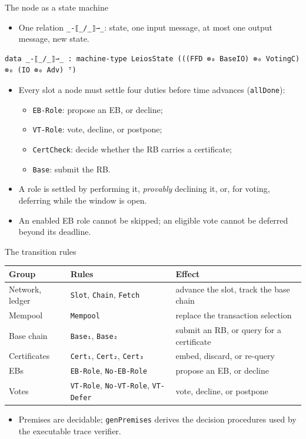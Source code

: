 \documentclass[aspectratio=169,10pt]{beamer}
\newcommand{\agda}[1]{\texttt{#1}}
\begin{document}
\begin{frame}[fragile]{The node as a state machine}
  \begin{itemize}
    \item One relation \agda{\_-⟦\_/\_⟧⇀\_}: state, one input message,
          at most one output message, new state.
  \end{itemize}
\begin{verbatim}
data _-⟦_/_⟧⇀_ : machine-type LeiosState (((FFD ⊗₀ BaseIO) ⊗₀ VotingC) ⊗₀ (IO ⊗₀ Adv) ᵀ)
\end{verbatim}
  \begin{itemize}
    \item Every slot a node must settle four duties before time advances
          (\agda{allDone}):
      \begin{itemize}
        \item \agda{EB-Role}: propose an EB, or decline;
        \item \agda{VT-Role}: vote, decline, or postpone;
        \item \agda{CertCheck}: decide whether the RB carries a certificate;
        \item \agda{Base}: submit the RB.
      \end{itemize}
    \item A role is settled by performing it, \emph{provably} declining it,
          or, for voting, deferring while the window is open.
    \item An enabled EB role cannot be skipped; an eligible vote cannot
          be deferred beyond its deadline.
  \end{itemize}
\end{frame}

\begin{frame}{The transition rules}
  \centering\small
  \begin{tabular}{@{}lll@{}}
    \toprule
    Group & Rules & Effect \\
    \midrule
    Network, ledger & \agda{Slot}, \agda{Chain}, \agda{Fetch}
      & advance the slot, track the base chain \\
    Mempool & \agda{Mempool} & replace the transaction selection \\
    Base chain & \agda{Base₁}, \agda{Base₂}
      & submit an RB, or query for a certificate \\
    Certificates & \agda{Cert₁}, \agda{Cert₂}, \agda{Cert₃}
      & embed, discard, or re-query \\
    EBs & \agda{EB-Role}, \agda{No-EB-Role} & propose an EB, or decline \\
    Votes & \agda{VT-Role}, \agda{No-VT-Role}, \agda{VT-Defer}
      & vote, decline, or postpone \\
    \bottomrule
  \end{tabular}

  \vspace{4mm}
  \begin{itemize}
    \item Premises are decidable; \agda{genPremises} derives the decision
          procedures used by the executable trace verifier.
  \end{itemize}
\end{frame}
\end{document}
